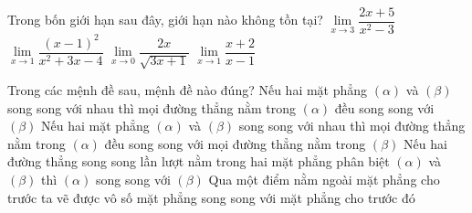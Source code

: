 \begin{ex}%
		Trong bốn giới hạn sau đây, giới hạn nào không tồn tại?
		\choice
		{$\displaystyle\lim\limits_{x\to 3}\dfrac{2x+5}{x^2-3}$}
		{$\displaystyle\lim\limits_{x\to 1}\dfrac{(x-1)^2}{x^2+3x-4}$}
		{$\displaystyle\lim\limits_{x\to 0}\dfrac{2x}{\sqrt{3x+1}}$}
		{\True $\displaystyle\lim\limits_{x\to 1}\dfrac{x+2}{x-1}$}
	\end{ex}

\begin{ex}%
		Trong các mệnh đề sau, mệnh đề nào đúng?
		\choice
		{\True Nếu hai mặt phẳng $\left (\alpha\right )$ và $\left (\beta\right )$ song song với nhau thì mọi đường thẳng nằm trong $\left (\alpha\right )$ đều song song với $\left (\beta\right )$ }
		{Nếu hai mặt phẳng $\left (\alpha\right )$ và $\left (\beta\right )$ song song với nhau thì mọi đường thẳng nằm trong $\left (\alpha\right )$ đều song song với mọi đường thẳng nằm trong $\left (\beta\right )$}
		{Nếu hai đường thẳng song song lần lượt nằm trong hai mặt phẳng phân biệt $\left (\alpha\right )$ và $\left (\beta\right )$ thì $\left (\alpha\right )$ song song với $\left (\beta\right )$}
		{Qua một điểm nằm ngoài mặt phẳng cho trước ta vẽ được vô số mặt phẳng song song với mặt phẳng cho trước đó}
		\end{ex}

